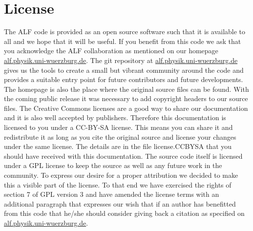 

\section*{License}

The  ALF code  is provided as an open source software  such that it is  available  to all and we  hope that  it 
will be useful.  If you benefit from this code  we ask that you acknowledge  the ALF collaboration  as mentioned on our
homepage \url{alf.physik.uni-wuerzburg.de}.   The git repository at   \url{alf.physik.uni-wuerzburg.de} gives us the tools to 
create a small but vibrant community around the code and provides a suitable entry point for future contributors  and future developments. 
The homepage is also the place where the original source files can be found.
With the coming public release it was necessary to add copyright headers to our source files.
The Creative Commons licenses are a good way to share our documentation and it is also well 
accepted by publishers. Therefore this documentation is licensed to you under a CC-BY-SA license.
This means you can share it and redistribute it as long as you cite the original source and
license your changes under the same license. The details are in the file license.CCBYSA that you should have received with this documentation.
The source code itself is licensed under a GPL license to keep the source as well as any future work in the community.
To express our desire for a proper attribution we decided to make this a visible part of the license.
To that end we have exercised the rights of section 7 of GPL version 3 and have amended
the license terms with an additional paragraph that expresses our wish that if an author has benefitted from this code
that he/she should consider giving back a citation as specified on \url{alf.physik.uni-wuerzburg.de}.
